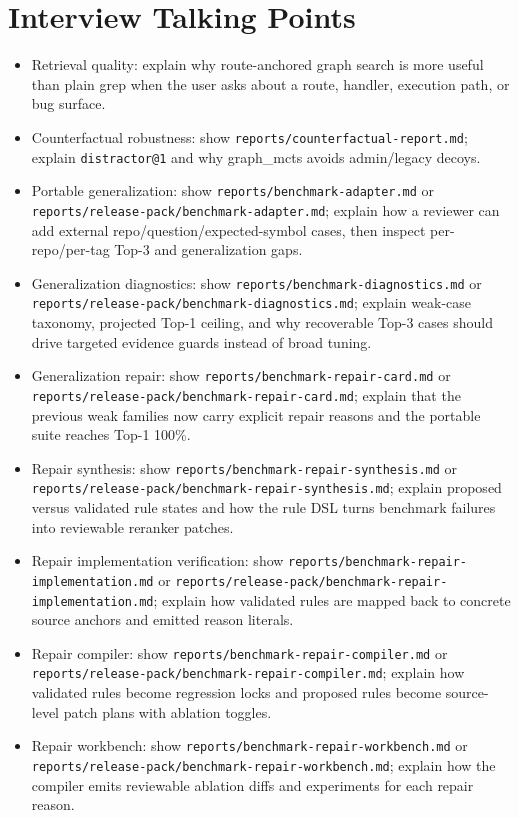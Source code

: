 \documentclass[UTF8,12pt,openany]{ctexbook}
\begin{document}
\section{Interview Talking Points}

\begin{itemize}
\item Retrieval quality: explain why route-anchored graph search is more useful than plain grep when the user asks about a route, handler, execution path, or bug surface.
\item Counterfactual robustness: show \texttt{reports/counterfactual-report.md}; explain \texttt{distractor@1} and why graph\_mcts avoids admin/legacy decoys.
\item Portable generalization: show \texttt{reports/benchmark-adapter.md} or \texttt{reports/release-pack/benchmark-adapter.md}; explain how a reviewer can add external repo/question/expected-symbol cases, then inspect per-repo/per-tag Top-3 and generalization gaps.
\item Generalization diagnostics: show \texttt{reports/benchmark-diagnostics.md} or \texttt{reports/release-pack/benchmark-diagnostics.md}; explain weak-case taxonomy, projected Top-1 ceiling, and why recoverable Top-3 cases should drive targeted evidence guards instead of broad tuning.
\item Generalization repair: show \texttt{reports/benchmark-repair-card.md} or \texttt{reports/release-pack/benchmark-repair-card.md}; explain that the previous weak families now carry explicit repair reasons and the portable suite reaches Top-1 100\%.
\item Repair synthesis: show \texttt{reports/benchmark-repair-synthesis.md} or \texttt{reports/release-pack/benchmark-repair-synthesis.md}; explain proposed versus validated rule states and how the rule DSL turns benchmark failures into reviewable reranker patches.
\item Repair implementation verification: show \texttt{reports/benchmark-repair-implementation.md} or \texttt{reports/release-pack/benchmark-repair-implementation.md}; explain how validated rules are mapped back to concrete source anchors and emitted reason literals.
\item Repair compiler: show \texttt{reports/benchmark-repair-compiler.md} or \texttt{reports/release-pack/benchmark-repair-compiler.md}; explain how validated rules become regression locks and proposed rules become source-level patch plans with ablation toggles.
\item Repair workbench: show \texttt{reports/benchmark-repair-workbench.md} or \texttt{reports/release-pack/benchmark-repair-workbench.md}; explain how the compiler emits reviewable ablation diffs and experiments for each repair reason.

\end{itemize}
\end{document}
